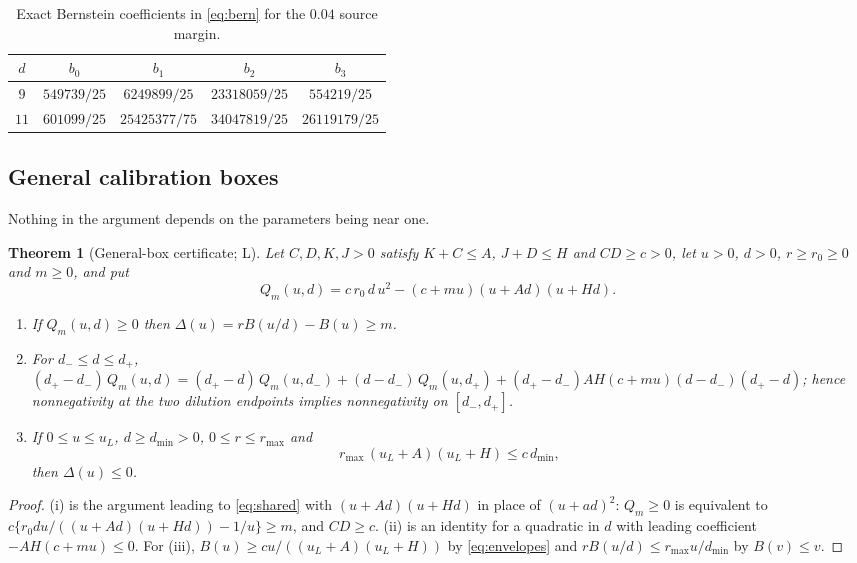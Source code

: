 \documentclass[11pt]{article}
\theoremstyle{plain}
\newtheorem{theorem}{Theorem}[section]
\theoremstyle{definition}
\numberwithin{equation}{section}
\newcommand{\Lean}{\textsf{L}}   %
\begin{document}
\begin{table}[t]
\centering\small
\caption{Exact Bernstein coefficients in \eqref{eq:bern} for the $0.04$ source margin.}
\label{tab:coefficients}
\begin{tabular}{@{}ccccc@{}}\toprule
$d$ & $b_0$ & $b_1$ & $b_2$ & $b_3$\\\midrule
$9$ & $549739/25$ & $6249899/25$ & $23318059/25$ & $554219/25$\\
$11$ & $601099/25$ & $25425377/75$ & $34047819/25$ & $26119179/25$\\\bottomrule
\end{tabular}
\end{table}

\subsection{General calibration boxes}\label{sec:general}
Nothing in the argument depends on the parameters being near one.

\begin{theorem}[General-box certificate; \Lean]\label{thm:general}
Let $C,D,K,J>0$ satisfy $K+C\le A$, $J+D\le H$ and $CD\ge c>0$, let $u>0$, $d>0$,
$r\ge r_0\ge0$ and $m\ge0$, and put
\begin{equation}\label{eq:general}
 Q_m(u,d)=c\,r_0\,d\,u^2-(c+mu)(u+Ad)(u+Hd).
\end{equation}
\begin{enumerate}[label=(\roman*),leftmargin=2.2em,itemsep=1pt]
\item If $Q_m(u,d)\ge0$ then $\Delta(u)=rB(u/d)-B(u)\ge m$.
\item For $d_-\le d\le d_+$,
$(d_+-d_-)\,Q_m(u,d)=(d_+-d)\,Q_m(u,d_-)+(d-d_-)\,Q_m(u,d_+)
+(d_+-d_-)AH(c+mu)(d-d_-)(d_+-d)$; hence nonnegativity at the two dilution
endpoints implies nonnegativity on $[d_-,d_+]$.
\item If $0\le u\le u_L$, $d\ge d_{\min}>0$, $0\le r\le r_{\max}$ and
\begin{equation}\label{eq:lowsign}
 r_{\max}\,(u_L+A)(u_L+H)\le c\,d_{\min},
\end{equation}
then $\Delta(u)\le0$.
\end{enumerate}
\end{theorem}
\begin{proof}
(i) is the argument leading to \eqref{eq:shared} with $(u+Ad)(u+Hd)$ in place of
$(u+ad)^2$: $Q_m\ge0$ is equivalent to
$c\{r_0du/((u+Ad)(u+Hd))-1/u\}\ge m$, and $CD\ge c$. (ii) is an identity for a
quadratic in $d$ with leading coefficient $-AH(c+mu)\le0$. For (iii),
$B(u)\ge cu/((u_L+A)(u_L+H))$ by \eqref{eq:envelopes} and
$rB(u/d)\le r_{\max}u/d_{\min}$ by $B(v)\le v$.
\end{proof}
\end{document}
